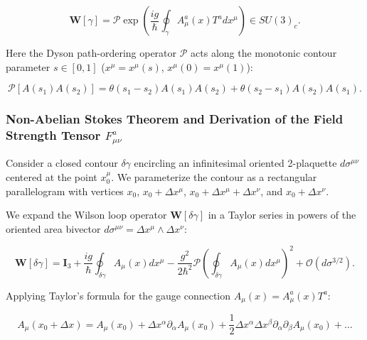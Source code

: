 \documentclass[11pt,a4paper]{article}
\theoremstyle{definition}
\begin{document}
\begin{equation}\label{eq:2.3.5}\tag{2.3.5}
\mathbf{W}[\gamma] = \mathcal{P}\exp\left( \frac{ig}{\hbar} \oint_{\gamma} A_\mu^a(x) T^a dx^\mu \right) \in SU(3)_c.
\end{equation}

Here the Dyson path-ordering operator $\mathcal{P}$ acts along the monotonic contour parameter $s \in [0, 1]$ ($x^\mu = x^\mu(s)$, $x^\mu(0) = x^\mu(1)$):

\begin{equation}\label{eq:2.3.6}\tag{2.3.6}
\mathcal{P}\left[ A(s_1) A(s_2) \right] = \theta(s_1 - s_2) A(s_1) A(s_2) + \theta(s_2 - s_1) A(s_2) A(s_1).
\end{equation}

\subsubsection{Non-Abelian Stokes Theorem and Derivation of the Field Strength Tensor $F_{\mu\nu}^a$}\label{sec:2.3.2}

Consider a closed contour $\delta\gamma$ encircling an infinitesimal oriented 2-plaquette $d\sigma^{\mu\nu}$ centered at the point $x_0^\mu$. We parameterize the contour as a rectangular parallelogram with vertices $x_0$, $x_0 + \Delta x^\mu$, $x_0 + \Delta x^\mu + \Delta x^\nu$, and $x_0 + \Delta x^\nu$.

We expand the Wilson loop operator $\mathbf{W}[\delta\gamma]$ in a Taylor series in powers of the oriented area bivector $d\sigma^{\mu\nu} = \Delta x^\mu \wedge \Delta x^\nu$:

\begin{equation}\label{eq:2.3.7}\tag{2.3.7}
\mathbf{W}[\delta\gamma] = \mathbf{I}_3 + \frac{ig}{\hbar} \oint_{\delta\gamma} A_\mu(x) dx^\mu - \frac{g^2}{2\hbar^2} \mathcal{P} \left( \oint_{\delta\gamma} A_\mu(x) dx^\mu \right)^2 + \mathcal{O}(d\sigma^{3/2}).
\end{equation}

Applying Taylor's formula for the gauge connection $A_\mu(x) = A_\mu^a(x) T^a$:

\begin{equation*}
A_\mu(x_0 + \Delta x) = A_\mu(x_0) + \Delta x^\alpha \partial_\alpha A_\mu(x_0) + \frac{1}{2} \Delta x^\alpha \Delta x^\beta \partial_\alpha \partial_\beta A_\mu(x_0) + \dots
\end{equation*}
\end{document}
